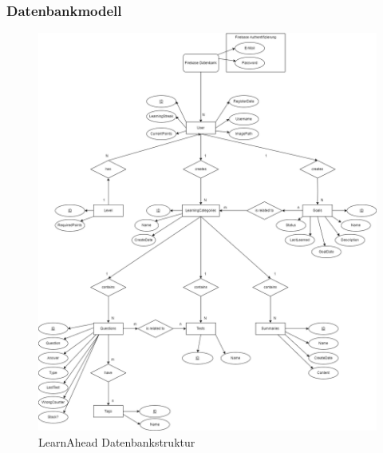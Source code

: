 \subsubsection{Datenbankmodell}
\begin{figure}[H]
  \centering
  \includegraphics[width=1\textwidth]{images/LearnAheadDatenbankstruktur.png}
  \caption{LearnAhead Datenbankstruktur}
  \label{fig:LearnAheadDatenbankstruktur}
\end{figure}\noindent
